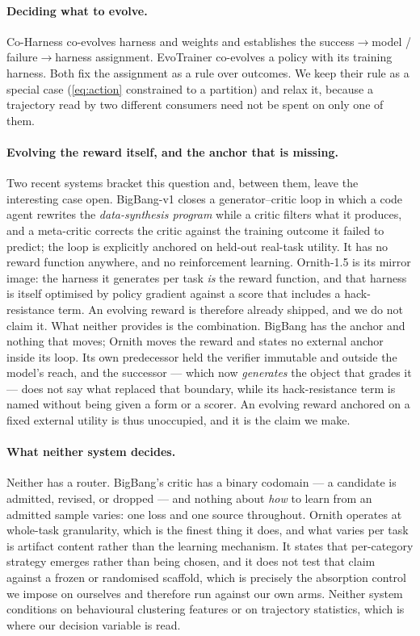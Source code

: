 \paragraph{Deciding what to evolve.} Co-Harness co-evolves harness and weights and
establishes the success$\to$model / failure$\to$harness assignment. EvoTrainer co-evolves a
policy with its training harness. Both fix the assignment as a rule over outcomes. We keep
their rule as a special case (\eqref{eq:action} constrained to a partition) and relax it,
because a trajectory read by two different consumers need not be spent on only one of them.

\paragraph{Evolving the reward itself, and the anchor that is missing.} Two recent systems
bracket this question and, between them, leave the interesting case open. BigBang-v1 closes a
generator--critic loop in which a code agent rewrites the \emph{data-synthesis program} while
a critic filters what it produces, and a meta-critic corrects the critic against the training
outcome it failed to predict; the loop is explicitly anchored on held-out real-task utility.
It has no reward function anywhere, and no reinforcement learning. Ornith-1.5 is its mirror
image: the harness it generates per task \emph{is} the reward function, and that harness is
itself optimised by policy gradient against a score that includes a hack-resistance term. An
evolving reward is therefore already shipped, and we do not claim it. What neither provides is
the combination. BigBang has the anchor and nothing that moves; Ornith moves the reward and
states no external anchor inside its loop. Its own predecessor held the verifier immutable and
outside the model's reach, and the successor --- which now \emph{generates} the object that
grades it --- does not say what replaced that boundary, while its hack-resistance term is
named without being given a form or a scorer. An evolving reward anchored on a fixed external
utility is thus unoccupied, and it is the claim we make.

\paragraph{What neither system decides.} Neither has a router. BigBang's critic has a binary
codomain --- a candidate is admitted, revised, or dropped --- and nothing about \emph{how} to
learn from an admitted sample varies: one loss and one source throughout. Ornith operates at
whole-task granularity, which is the finest thing it does, and what varies per task is
artifact content rather than the learning mechanism. It states that per-category strategy
emerges rather than being chosen, and it does not test that claim against a frozen or
randomised scaffold, which is precisely the absorption control we impose on ourselves and
therefore run against our own arms. Neither system conditions on behavioural clustering
features or on trajectory statistics, which is where our decision variable is read.

